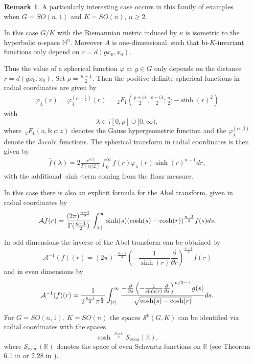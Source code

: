 \documentclass[12pt,reqno,a4paper]{amsart}
\theoremstyle{theorem}
\theoremstyle{definition}
\newtheorem{remark}[theorem]{Remark}
\numberwithin{theorem}{section}
\numberwithin{equation}{section}
\newcommand{\R}{\mathbb{R}}
\DeclarePairedDelimiter{\abs}{\lvert}{\rvert}
\begin{document}
\begin{remark}\label{r:harmonic_analysis_hyperbolic_space}
	A particularly interesting case occurs in this family of examples when $G=SO(n,1)$ and $K=SO(n)$, $n\geq 2$.
	
	In this case $G/K$ with the Riemannian metric induced by $\kappa$ is isometric to the hyperbolic $n$-space $\mathbb{H}^n$.
	Moreover $A$ is one-dimensional, such that bi-$K$-invariant functions only depend on $r=d(gx_0,x_0)$.
	
	Thus the value of a spherical function $\varphi$ at $g\in G$ only depends on the distance $r=d(gx_0, x_0)$. 
	Set $\rho = \frac{n-1}{2}$. 
	Then the positive definite spherical functions in radial coordinates are given by
	\begin{align*}
		\varphi_\lambda(r)= \varphi_\lambda^{(\rho, -\frac{1}{2})}(r) = ~_2F_1\left(\frac{\rho+i\lambda}{2}, \frac{\rho-i\lambda}{2};\frac{n}{2}; -\sinh(r)^2\right)
	\end{align*}
	with \[\lambda\in i[0,\rho] \cup [0,\infty),\]
	where $~_2F_1(a,b;c;z)$ denotes the Gauss hypergeometric function and the $\varphi_\lambda^{(\alpha,\beta)}$ denote the Jacobi functions.
	The spherical transform in radial coordinates is then given by
	\begin{align*}
		\widehat{f}(\lambda) = 2\frac{\pi^{n/2}}{\Gamma(n/2)}\int_0^\infty f(r)\varphi_{\lambda}(r)\sinh(r)^{n-1}dr,
	\end{align*}
	with the additional $\sinh$-term coming from the Haar measure.
	
	In this case there is also an explicit formula for the Abel transform, given in radial coordinates by
	\[\mathcal{A}f(r) = \frac{(2\pi)^{\frac{n-1}{2}}}{\Gamma(\frac{n-1}{2})}\int_{\abs{r}}^\infty\sinh(s)(\cosh(s)-\cosh(r))^{\frac{n-3}{2}}f(s)ds.\]
	
	In odd dimensions the inverse of the Abel transform can be obtained by
	\[\mathcal{A}^{-1}(f)(r) = (2\pi)^{-\frac{n-1}{2}}\left(-\frac{1}{\sinh(r)}\frac{\partial}{\partial r}\right)^{\frac{n-1}{2}}f(r)\]
	and in even dimensions by 
	\[\mathcal{A}^{-1}(f)(r) = \frac{1}{2^{\frac{n-1}{2}}\pi^{\frac{n}{2}}}\int_{\abs{r}}^\infty\frac{-\frac{\partial}{\partial s}\left (-\frac{1}{\sinh(r)}\frac{\partial}{\partial s}\right)^{n/2-1}g(s)}{\sqrt{\cosh(s)-\cosh(r)}}ds.\]
	

	
	
	For $G = SO(n,1)$, $K=SO(n)$ the spaces $\mathscr{S}^p(G, K)$ can be identified via radial coordinates with the spaces \[\cosh^{-\frac{n-1}{p}}\mathscr{S}_{\mathrm{even}}(\R),\] where $\mathscr{S}_\mathrm{even}(\R)$ denotes the space of even Schwartz functions on $\R$ (see Theorem 6.1 in \cite{Koornwinder} or 2.28 in \cite{AnkerHarmonicANGroups}).
	

\end{remark}
\end{document}
